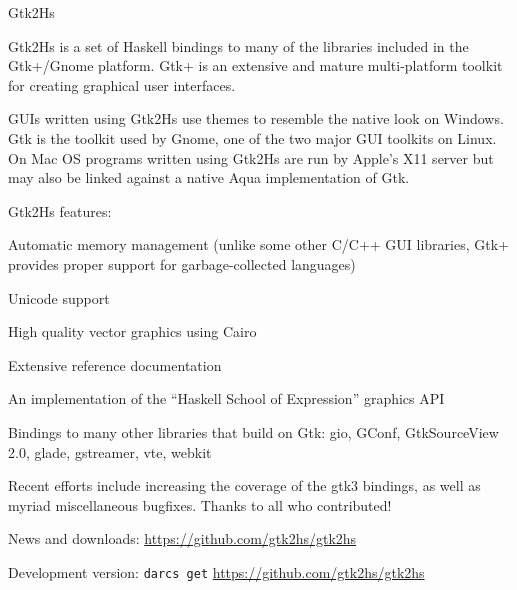 \begin{hcarentry}{Gtk2Hs}
\label{gtk2hs}
\makeheader

Gtk2Hs is a set of Haskell bindings to many of the libraries included
in the Gtk+/Gnome platform. Gtk+ is an extensive and mature
multi-platform toolkit for creating graphical user interfaces.

GUIs written using Gtk2Hs use themes to resemble the native look on
Windows. Gtk is the toolkit used by Gnome, one of the two major GUI toolkits
on Linux. On Mac OS programs written using Gtk2Hs are run by Apple's
X11 server but may also be linked against a native Aqua implementation
of Gtk.

\Separate
Gtk2Hs features:
\begin{compactitem}
\item Automatic memory management (unlike some other C/C++ GUI
libraries, Gtk+ provides proper support for garbage-collected languages)
\item Unicode support
\item High quality vector graphics using Cairo
\item Extensive reference documentation
\item An implementation of the ``Haskell School of Expression'' graphics
API
\item Bindings to many other libraries that build on Gtk: gio, GConf,
  GtkSourceView 2.0, glade, gstreamer, vte, webkit
\end{compactitem}

\Separate

Recent efforts include increasing the coverage of the gtk3 bindings, as well
as myriad miscellaneous bugfixes. Thanks to all who contributed!

\FurtherReading
\begin{compactitem}
\item News and downloads:
  \url{https://github.com/gtk2hs/gtk2hs}

\item Development version:
  \texttt{darcs get} \url{https://github.com/gtk2hs/gtk2hs}
\end{compactitem}
\end{hcarentry} 
